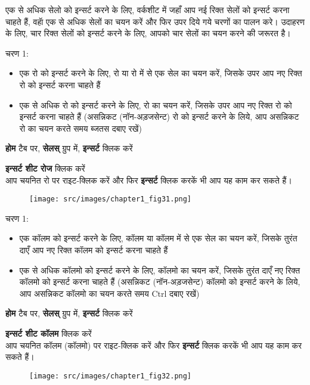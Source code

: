 एक से अधिक सेलो को इन्सर्ट करने के लिए, वर्कशीट में जहाँ आप नई रिक्त सेलों को इन्सर्ट करना चाहते हैं, वहॅा एक से अधिक सेलों का चयन करें और फिर उपर दिये गये चरणों का पालन करे। उदाहरण के लिए, चार रिक्त सेलों को इन्सर्ट करने के लिए, आपको चार सेलों का चयन करने की जरूरत है।

\begin{descriptionSimple}{चरण 1:}
\item[चरण 1]
		\begin{itemize}
		\item एक रो को इन्सर्ट करने के लिए, रो या रो में से एक सेल का चयन करें, जिसके उपर आप नए रिक्त रो को इन्सर्ट करना चाहते हैं
		\item एक से अधिक रो को इन्सर्ट करने के लिए, रो का चयन करें, जिसके उपर आप नए रिक्त रो को इन्सर्ट करना चाहते हैं (असन्निकट (नॉन-अड़जसेन्ट) रो को इन्सर्ट करने के लिये, आप असन्निकट रो का चयन करते समय ब्जतस दबाए रखें)		\end{itemize}
\item[चरण 2] \textbf{होम} टैब पर, \textbf{सेलस्} ग्रुप में, \textbf{इन्सर्ट} क्लिक करें
\item[चरण 3] \textbf{इन्सर्ट शीट रोज} क्लिक करें\\ आप चयनित रो पर राइट-क्लिक करें और फिर \textbf{इन्सर्ट} क्लिक करकें भी आप यह काम कर सकते हैं।
\end{descriptionSimple}
\begin{figure}[H]
\centering
\texttt{[image: src/images/chapter1\_fig31.png]}
\end{figure}

\begin{descriptionSimple}{चरण 1:}
\item[चरण 1]
		\begin{itemize}
		\item एक कॉलम को इन्सर्ट करने के लिए, कॉलम या कॉलम में से एक सेल का चयन करें, जिसके तुरंत दाएँ आप नए रिक्त कॉलम को इन्सर्ट करना चाहते हैं
		\item एक से अधिक कॉलमो को इन्सर्ट करने के लिए, कॉलमो का चयन करें, जिसके तुरंत दाएँ नए रिक्त कॉलमो को इन्सर्ट करना चाहते हैं (असन्निकट (नॉन-अड़जसेन्ट) कॉलमो को इन्सर्ट करने के लिये, आप असन्निकट कॉलमो का चयन करते समय  {\rm Ctrl}  दबाए रखें)
		\end{itemize}
\item[चरण 2] \textbf{होम} टैब पर, \textbf{सेलस्} ग्रुप में, \textbf{इन्सर्ट} क्लिक करें
\item[चरण 3] \textbf{इन्सर्ट शीट कॉलम} क्लिक करें\\  आप चयनित कॉलम (कॉलमो) पर राइट-क्लिक करें और फिर \textbf{इन्सर्ट} क्लिक करकें भी आप यह काम कर सकते हैं।
\end{descriptionSimple}
\begin{figure}[H]
\centering
\texttt{[image: src/images/chapter1\_fig32.png]}
\end{figure}

